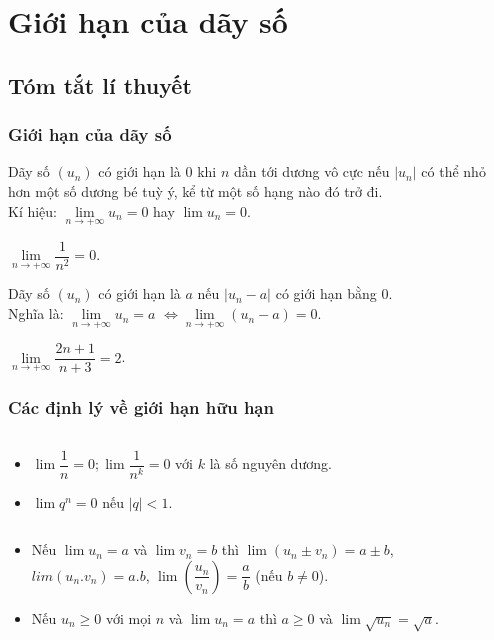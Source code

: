 \section{Giới hạn của dãy số}
\subsection{Tóm tắt lí thuyết}
\subsubsection{Giới hạn của dãy số}
\begin{dn}
	Dãy số $(u_n)$ có giới hạn là $0$ khi $n$ dần tới dương vô cực nếu $|u_n|$ có thể nhỏ hơn một số dương bé tuỳ ý, kể từ một số hạng nào đó trở đi.\\
	Kí hiệu: $\lim\limits_{n \to +\infty}u_n=0$ hay $\lim u_n=0$.
\end{dn}

\begin{vd}
	$\lim\limits_{n \to +\infty}\dfrac{1}{n^2}=0$.
\end{vd}

\begin{dn}
	Dãy số $(u_n)$ có giới hạn là $a$ nếu $|u_n-a|$ có giới hạn bằng $0$.\\
	Nghĩa là: $\lim\limits_{n \to +\infty}u_n=a$  $\Leftrightarrow \lim\limits_{n \to +\infty}(u_n-a)=0$.
\end{dn}

\begin{vd}
	$\lim\limits_{n\to +\infty}{\dfrac{2n+1}{n+3}}=2$.
\end{vd}
\subsubsection{Các định lý về giới hạn hữu hạn}
\begin{dl}$\textrm{ }$\\
	\begin{itemize}
\item  $\lim \dfrac{1}{n}=0; \lim \dfrac{1}{n^k}=0$ với $k$ là số nguyên dương.\\
\item  $\lim q^n=0$ nếu $|q|<1$.
\end{itemize}
\end{dl}

\begin{dl}$\textrm{ }$\\
	\begin{itemize}
		\item  Nếu $\lim u_n=a$ và $\lim v_n=b$  thì $\lim \left(u_n\pm v_n\right)=a\pm b$, $lim \left(u_n.v_n\right)=a.b$, $\lim\left(\dfrac{u_n}{v_n}\right)=\dfrac{a}{b}$ (nếu $b\neq 0$).
		\item  Nếu $u_n\geq 0$ với mọi $n$ và $\lim u_n=a$ thì $a\geq 0$ và $\lim\sqrt{u_n}=\sqrt{a}$.
	\end{itemize}
\end{dl}


